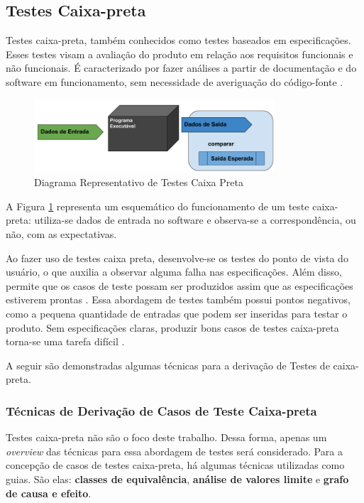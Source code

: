 \subsection{Testes Caixa-preta}
Testes caixa-preta, também conhecidos como testes baseados em especificações. Esses testes visam a avaliação do produto em relação aos requisitos funcionais e não funcionais. É caracterizado por fazer análises a partir de documentação e do software em funcionamento, sem necessidade de averiguação do código-fonte \cite{barbosaEtAl2009}.

\begin{figure}[h]
  \centering
    \includegraphics[width=0.8\textwidth]{figuras/test_black_box.png}
    \caption{Diagrama Representativo de Testes Caixa Preta}
    \label{test_black_box}
\end{figure}

A Figura \ref{test_black_box} representa um esquemático do funcionamento de um teste caixa-preta: utiliza-se dados de entrada no software e observa-se a correspondência, ou não, com as expectativas.
\par
\indent Ao fazer uso de testes caixa preta, desenvolve-se os testes do ponto de vista do usuário, o que auxilia a observar alguma falha nas especificações. Além disso, permite que os casos de teste possam ser produzidos assim que as especificações estiverem prontas \cite{stf2010}. Essa abordagem de testes também possui pontos negativos, como a pequena quantidade de entradas que podem ser inseridas para testar o produto. Sem especificações claras, produzir bons casos de testes caixa-preta torna-se uma tarefa difícil \cite{stf2010}.
\par
\indent A seguir são demonstradas algumas técnicas para a derivação de Testes de caixa-preta.

\subsubsection{Técnicas de Derivação de Casos de Teste Caixa-preta}
Testes caixa-preta não são o foco deste trabalho. Dessa forma, apenas um \textit{overview} das técnicas para essa abordagem de testes será considerado. Para a concepção de casos de testes caixa-preta, há algumas técnicas utilizadas como guias. São elas: \textbf{classes de equivalência}, \textbf{análise de valores limite} e \textbf{grafo de causa e efeito}.

